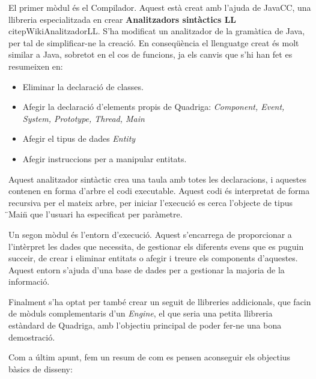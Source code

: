   El primer mòdul és el Compilador. Aquest està creat amb l'ajuda de JavaCC, una llibreria especialitzada en crear {\bf Analitzadors sintàctics LL} citep{WikiAnalitzadorLL}. S'ha modificat un analitzador de la gramàtica de Java, per tal de simplificar-ne la creació. En conseqüència el llenguatge creat és molt similar a Java, sobretot en el cos de funcions, ja els canvis que s'hi han fet es resumeixen en:
  
  \begin{itemize}
    \item Eliminar la declaració de classes.
    \item Afegir la declaració d'elements propis de Quadriga: {\em Component, Event, System, Prototype, Thread, Main}
    \item Afegir el tipus de dades {\em Entity}
    \item Afegir instruccions per a manipular entitats.
  \end{itemize}
  
  Aquest analitzador sintàctic crea una taula amb totes les declaracions, i aquestes contenen en forma d'arbre el codi executable. Aquest codi és interpretat de forma recursiva per el mateix arbre, per iniciar l'execució es cerca l'objecte de tipus \"{}Main\"{} que l'usuari ha especificat per paràmetre.
  
  Un segon mòdul és l'entorn d'execució. Aquest s'encarrega de proporcionar a l'intèrpret les dades que necessita, de gestionar els diferents evens que es puguin succeir, de crear i eliminar entitats o afegir i treure els components d'aquestes. Aquest entorn s'ajuda d'una base de dades per a gestionar la majoria de la informació.
  
  Finalment s'ha optat per també crear un seguit de llibreries addicionals, que facin de mòduls complementaris d'un {\em Engine}, el que seria una petita llibreria estàndard de Quadriga, amb l'objectiu principal de poder fer-ne una bona demostració.
  
  
  Com a últim apunt, fem un resum de com es pensen aconseguir els objectius bàsics de disseny:

